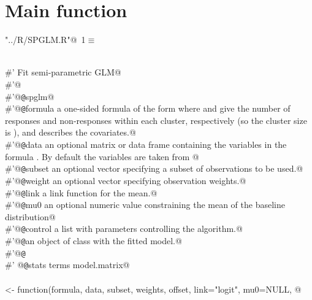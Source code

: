 \documentclass[reqno]{amsart}
\renewcommand{\NWtarget}[2]{\hypertarget{#1}{#2}}
\begin{document}
\section{Main function}

\begin{flushleft} \small\label{scrap1}\raggedright\small
\NWtarget{nuweb1}{} \verb@"../R/SPGLM.R"@\nobreak\ {\footnotesize {1}}$\equiv$
\vspace{-1ex}
\begin{list}{}{} \item
\mbox{}\verb@@\\
\mbox{}\verb@#' Fit semi-parametric GLM@\\
\mbox{}\verb@#'@\\
\mbox{}\verb@#'@{\tt @}\verb@rdname spglm@\\
\mbox{}\verb@#'@{\tt @}\verb@param formula a one-sided formula of the form  where  and  give the number of responses and non-responses within each cluster, respectively (so the cluster size is ), and  describes the covariates.@\\
\mbox{}\verb@#'@{\tt @}\verb@param data  an optional matrix or data frame containing the variables in the formula . By default the variables are taken from @\\
\mbox{}\verb@#'@{\tt @}\verb@param subset  an optional vector specifying a subset of observations to be used.@\\
\mbox{}\verb@#'@{\tt @}\verb@param weight  an optional vector specifying observation weights.@\\
\mbox{}\verb@#'@{\tt @}\verb@param link      a link function for the mean.@\\
\mbox{}\verb@#'@{\tt @}\verb@param mu0       an optional numeric value constraining the mean of the baseline distribution@\\
\mbox{}\verb@#'@{\tt @}\verb@param control a list with parameters controlling the algorithm.@\\
\mbox{}\verb@#'@{\tt @}\verb@return an object of class  with the fitted model.@\\
\mbox{}\verb@#'@{\tt @}\verb@export@\\
\mbox{}\verb@#' @{\tt @}\verb@importFrom stats terms model.matrix@\\
\mbox{}\verb@@\\
\mbox{}\verb@spglm <- function(formula, data, subset, weights, offset, link="logit", mu0=NULL, @\\

\end{list}
\end{flushleft}
\end{document}
